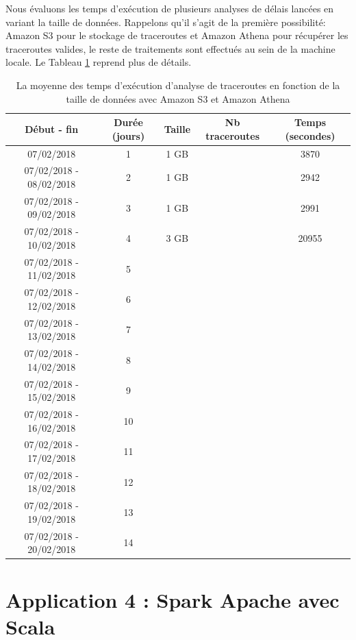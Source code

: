 Nous évaluons les temps d'exécution de plusieurs  analyses de délais lancées en variant la taille de données. Rappelons qu'il s'agit de la première possibilité: Amazon S3 pour le stockage de traceroutes et Amazon Athena pour récupérer les traceroutes valides, le reste de traitements sont effectués au sein de la machine locale.  Le Tableau	\ref{tab:awstiming-timing} reprend plus de détails. 
\begin{table}[H]
	
	\captionsetup{justification=centering}
	\begin{tabular}{ccccc}
		\textbf{Début - fin} &\textbf{Durée (jours)}  & \textbf{Taille}  & \textbf{Nb traceroutes} & \textbf{Temps (secondes)} \\ \hline
		
		07/02/2018             &1 &1 GB&& 3870\\ \hline
		07/02/2018 - 08/02/2018&2 &1 GB&& 2942\\ \hline
		07/02/2018 - 09/02/2018&3 & 1 GB&& 2991\\ \hline
		07/02/2018 - 10/02/2018&4 & 3 GB&& 20955\\ \hline
		07/02/2018 - 11/02/2018&5& && \\ \hline
		07/02/2018 - 12/02/2018&6& && \\ \hline
		07/02/2018 - 13/02/2018&7& && \\ \hline
		07/02/2018 - 14/02/2018&8& && \\ \hline
		07/02/2018 - 15/02/2018&9& && \\ \hline
		07/02/2018 - 16/02/2018&10& && \\ \hline
		07/02/2018 - 17/02/2018&11& && \\ \hline
		07/02/2018 - 18/02/2018&12& && \\ \hline
		07/02/2018 - 19/02/2018&13& && \\ \hline
		07/02/2018 - 20/02/2018&14& && \\ \hline
	\end{tabular}
	\caption{La moyenne des temps d'exécution d'analyse de traceroutes en fonction de la taille de données avec Amazon S3 et Amazon Athena }
	\label{tab:awstiming-timing}
\end{table}


\section{Application 4 : Spark Apache avec Scala}

